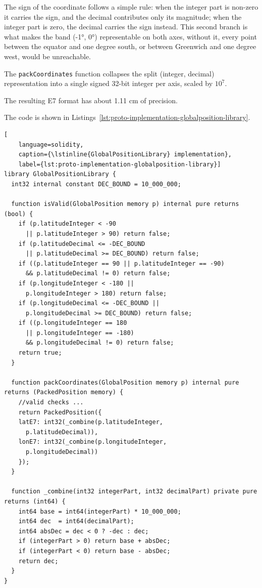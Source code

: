 The sign of the coordinate follows a simple rule: when the integer part is non-zero it carries the sign, and the decimal contributes only its magnitude; when the integer part is zero, the decimal carries the sign instead.
This second branch is what makes the band (-1°, 0°) representable on both axes, without it, every point between the equator and one degree south, or between Greenwich and one degree west, would be unreachable.

The \lstinline{packCoordinates} function collapses the split (integer, decimal) representation into a single signed 32-bit integer per axis, scaled by $10^7$.

The resulting E7 format has about 1.11 cm of precision.

The code is shown in Listings~\ref{lst:proto-implementation-globalposition-library}.
\begin{lstlisting}[
    language=solidity,
    caption={\lstinline{GlobalPositionLibrary} implementation},
    label={lst:proto-implementation-globalposition-library}]
library GlobalPositionLibrary {
  int32 internal constant DEC_BOUND = 10_000_000;

  function isValid(GlobalPosition memory p) internal pure returns (bool) {
    if (p.latitudeInteger < -90
      || p.latitudeInteger > 90) return false;
    if (p.latitudeDecimal <= -DEC_BOUND
      || p.latitudeDecimal >= DEC_BOUND) return false;
    if ((p.latitudeInteger == 90 || p.latitudeInteger == -90)
      && p.latitudeDecimal != 0) return false;
    if (p.longitudeInteger < -180 ||
      p.longitudeInteger > 180) return false;
    if (p.longitudeDecimal <= -DEC_BOUND ||
      p.longitudeDecimal >= DEC_BOUND) return false;
    if ((p.longitudeInteger == 180
      || p.longitudeInteger == -180)
      && p.longitudeDecimal != 0) return false;
    return true;
  }

  function packCoordinates(GlobalPosition memory p) internal pure returns (PackedPosition memory) {
    //valid checks ...
    return PackedPosition({
    latE7: int32(_combine(p.latitudeInteger,
      p.latitudeDecimal)),
    lonE7: int32(_combine(p.longitudeInteger,
      p.longitudeDecimal))
    });
  }

  function _combine(int32 integerPart, int32 decimalPart) private pure returns (int64) {
    int64 base = int64(integerPart) * 10_000_000;
    int64 dec  = int64(decimalPart);
    int64 absDec = dec < 0 ? -dec : dec;
    if (integerPart > 0) return base + absDec;
    if (integerPart < 0) return base - absDec;
    return dec;
  }
}
\end{lstlisting}

